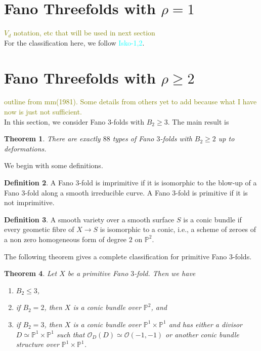 \documentclass[12pt]{amsart}
\theoremstyle{plain}
\newtheorem{theorem}{Theorem}[section]
\theoremstyle{definition}
\newtheorem{definition}[theorem]{Definition}
\theoremstyle{expl}
\begin{document}
	  
\section{Fano Threefolds with $\rho =1$}
	\textcolor{olive}{ $V_d$ notation, etc that will be used in next section}\\
	For the classification here, we follow \textcolor{cyan}{Isko-1,2}.
\section{Fano Threefolds with $\rho \geq 2$}
	\textcolor{olive}{outline from mm(1981). Some details from others yet to add because what I have now is just not sufficient.}\\ 
	In this section, we consider Fano $3$-folds with $B_2 \geq 3$. The main result is 
	\begin{theorem}
	There are exactly $88$ types of Fano $3$-folds with $B_2 \geq 2$ up to deformations.
	\end{theorem}
	We begin with some definitions. 
	\begin{definition}
		A Fano $3$-fold is imprimitive if it is isomorphic to the blow-up of a Fano $3$-fold along a smooth irreducible curve. A Fano $3$-fold is primitive if it is not imprimitive.
	\end{definition}
    \begin{definition}
    	A smooth variety over a smooth surface $S$ is a conic bundle if every geometic fibre of $X \to S$ is isomorphic to a conic, i.e., a scheme of zeroes of a non zero homogeneous form of degree $2$ on $\mathbb{P}^2$.
    \end{definition}
    \noindent The following theorem gives a complete classification for primitive Fano $3$-folds.
    \begin{theorem}
    	Let $X$ be a primitive Fano $3$-fold. Then we have 
    	\begin{enumerate}
    		\item $B_2 \leq 3$,
		\item if $B_2 =2$, then $X$ is a conic bundle over $\mathbb{P}^2$, and
    		\item if $B_2 =3$, then $X$ is a conic bundle over $\mathbb{P}^1 \times \mathbb{P}^1$ and has either a divisor $D \simeq \mathbb{P}^1 \times \mathbb{P}^1$ such that $\mathcal{O}_D(D) \simeq \mathcal{O}(-1,-1)$ or another conic bundle structure over $\mathbb{P}^1 \times \mathbb{P}^1$.
    	\end{enumerate}
    \end{theorem}
\end{document}
